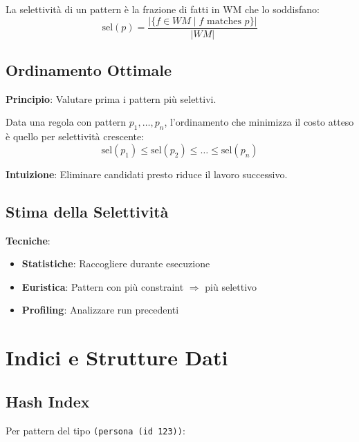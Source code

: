 \begin{definizione}[Selettività]
La selettività di un pattern è la frazione di fatti in WM che lo soddisfano:
\begin{equation}
\text{sel}(p) = \frac{|\{f \in WM \mid f \text{ matches } p\}|}{|WM|}
\end{equation}
\end{definizione}

\subsection{Ordinamento Ottimale}

\textbf{Principio}: Valutare prima i pattern più selettivi.

\begin{teorema}
Data una regola con pattern $p_1, \ldots, p_n$, l'ordinamento che minimizza il costo atteso è quello per selettività crescente:
\begin{equation}
\text{sel}(p_1) \leq \text{sel}(p_2) \leq \ldots \leq \text{sel}(p_n)
\end{equation}
\end{teorema}

\textbf{Intuizione}: Eliminare candidati presto riduce il lavoro successivo.

\subsection{Stima della Selettività}

\textbf{Tecniche}:
\begin{itemize}
\item \textbf{Statistiche}: Raccogliere durante esecuzione
\item \textbf{Euristica}: Pattern con più constraint $\Rightarrow$ più selettivo
\item \textbf{Profiling}: Analizzare run precedenti
\end{itemize}

\section{Indici e Strutture Dati}

\subsection{Hash Index}

Per pattern del tipo \texttt{(persona (id 123))}:

